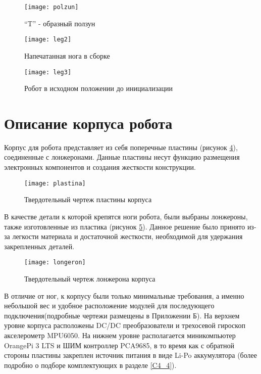 \begin{figure}[h!]
	\begin{center}
		\texttt{[image: polzun]}
		\caption{``T'' - образный ползун}
		\label{polzun}
	\end{center}
\end{figure}

\begin{figure}[h!]
	\begin{center}
		\texttt{[image: leg2]}
		\caption{Напечатанная нога в сборке}
		\label{leg2}
	\end{center}
\end{figure}

\begin{figure}[h!]
	\begin{center}
		\texttt{[image: leg3]}
		\caption{Робот в исходном положении до инициализации}
		\label{leg3}
	\end{center}
\end{figure}

\newpage
\section{Описание корпуса робота}\label{C4_3}

Корпус для робота представляет из себя поперечные пластины (рисунок \ref{plastina}), соединенные с лонжеронами. Данные пластины несут функцию размещения электронных компонентов и создания жесткости конструкции. 

\begin{figure}[h!]
	\begin{center}
		\texttt{[image: plastina]}
		\caption{Твердотельный чертеж пластины корпуса}
		\label{plastina}
	\end{center}
\end{figure}

В качестве детали к которой крепятся ноги робота, были выбраны лонжероны, также изготовленные из пластика (рисунок \ref{longeron}). Данное решение было принято из-за легкости материала и достаточной жесткости, необходимой для удержания закрепленных деталей. 

\begin{figure}[h!]
	\begin{center}
		\texttt{[image: longeron]}
		\caption{Твердотельный чертеж лонжерона корпуса}
		\label{longeron}
	\end{center}
\end{figure}
\pagebreak
В отличие от ног, к корпусу были только минимальные требования, а именно небольшой вес и удобное расположение модулей для последующего подключения(подробные чертежи размещены в Приложении Б). На верхнем уровне корпуса расположены DC/DC преобразователи и трехосевой гироскоп акселерометр MPU6050. На нижнем уровне располагается миникомпьютер OrangePi 3 LTS и ШИМ контроллер PCA9685, в то время как с обратной стороны пластины закреплен источник питания в виде Li-Po аккумулятора (более подробно о подборе комплектующих в разделе \ref{C4_4}).



